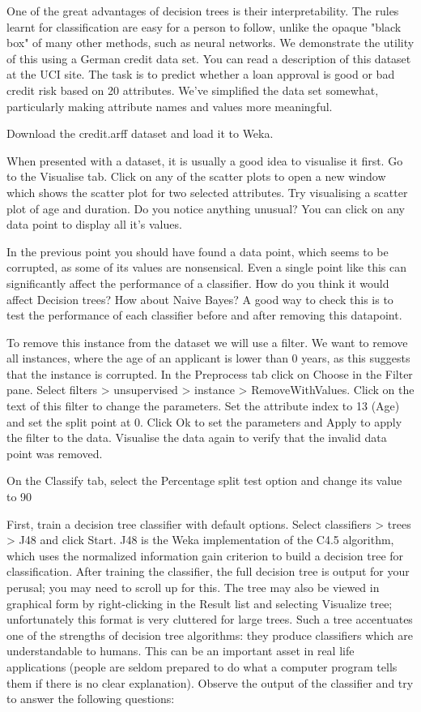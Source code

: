 \documentclass{article}
\begin{document}
One of the great advantages of decision trees is their interpretability. The rules learnt for classification are easy for a person to follow, unlike the opaque "black box" of many other methods, such as neural networks. We demonstrate the utility of this using a German credit data set. You can read a description of this dataset at the UCI site. The task is to predict whether a loan approval is good or bad credit risk based on 20 attributes. We've simplified the data set somewhat, particularly making attribute names and values more meaningful.

Download the credit.arff dataset and load it to Weka.

When presented with a dataset, it is usually a good idea to visualise it first. Go to the Visualise tab. Click on any of the scatter plots to open a new window which shows the scatter plot for two selected attributes. Try visualising a scatter plot of age and duration. Do you notice anything unusual? You can click on any data point to display all it's values.

In the previous point you should have found a data point, which seems to be corrupted, as some of its values are nonsensical. Even a single point like this can significantly affect the performance of a classifier. How do you think it would affect Decision trees? How about Naive Bayes? A good way to check this is to test the performance of each classifier before and after removing this datapoint.

To remove this instance from the dataset we will use a filter. We want to remove all instances, where the age of an applicant is lower than 0 years, as this suggests that the instance is corrupted. In the Preprocess tab click on Choose in the Filter pane. Select filters > unsupervised > instance > RemoveWithValues. Click on the text of this filter to change the parameters. Set the attribute index to 13 (Age) and set the split point at 0. Click Ok to set the parameters and Apply to apply the filter to the data. Visualise the data again to verify that the invalid data point was removed.

On the Classify tab, select the Percentage split test option and change its value to 90%

First, train a decision tree classifier with default options. Select classifiers > trees > J48 and click Start. J48 is the Weka implementation of the C4.5 algorithm, which uses the normalized information gain criterion to build a decision tree for classification.
After training the classifier, the full decision tree is output for your perusal; you may need to scroll up for this. The tree may also be viewed in graphical form by right-clicking in the Result list and selecting Visualize tree; unfortunately this format is very cluttered for large trees. Such a tree accentuates one of the strengths of decision tree algorithms: they produce classifiers which are understandable to humans. This can be an important asset in real life applications (people are seldom prepared to do what a computer program tells them if there is no clear explanation). Observe the output of the classifier and try to answer the following questions:
\end{document}
